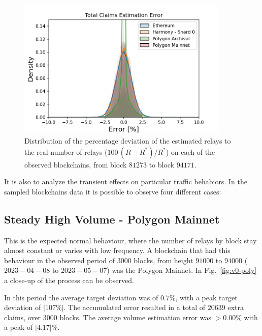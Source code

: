 \documentclass[runningheads]{llncs}
\begin{document}
\begin{figure}
    \includegraphics[width=0.9\textwidth]{v0_all_error_volume.png}
    \caption{Distribution of the percentage deviation of the estimated relays to the real number of relays ($100\, (R-R^*)/R^*$) on each of the observed blockchains, from block $81273$  to block $94171$.} \label{fig:v0-target-error2}
\end{figure}

It is also to analyze the transient effects on particular traffic behabiors. In the sampled blockchains data it is possible to observe four different cases:

\subsection{Steady High Volume - Polygon Mainnet}
This is the expected normal behaviour, where the number of relays by block stay almost constant or varies with low frequency. A blockchain that had this behaviour in the observed period of $3000$ blocks, from height $91000$ to $94000$ ($2023-04-08$ to $2023-05-07$) was the Polygon Mainnet. In Fig.~\ref{fig:v0-poly} a close-up of the process can be observed.

In this period the average target deviation was of $0.7\%$, with a peak target deviation of $|107 \%|$. The accumulated error resulted in a total of $20639$ extra claims, over $3000$ blocks. The average volume estimation error was $>0.00 \%$ with a peak of $|4.17| \%$.
\end{document}
